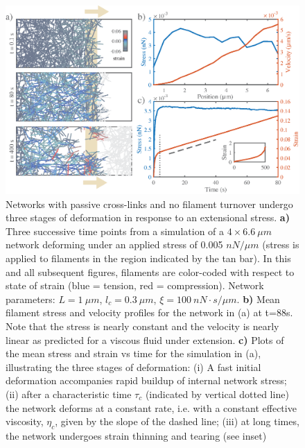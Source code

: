 \documentclass[10pt,letterpaper]{article}
\begin{document}
\begin{figure}[h!]
\centering
\includegraphics[width=\hsize]{figures/figure2}
\caption{\label{fig:passive_ex}  Networks with passive cross-links and no filament turnover undergo three stages of deformation in response to an extensional stress.   \textbf{a)} Three successive time points from a simulation of a $4\times6.6\: \mu m$ network deforming under an applied stress of 0.005 $nN/\mu m$ (stress is applied to filaments in the region indicated by the tan bar). In this and all subsequent figures, filaments are color-coded with respect to state of strain (blue = tension, red = compression).  Network parameters: $L=1\: \mu m$, $l_c=0.3\: \mu m$, $\xi=100\: nN\cdot s/\mu m$. \textbf{b)} Mean filament stress and velocity profiles for the  network in (a) at t=88s. Note that the stress is nearly constant and the velocity is nearly linear as predicted for a viscous fluid under extension.  \textbf{c)} Plots of the mean stress and strain vs time for the simulation in (a), illustrating the three stages of deformation: (i) A fast initial deformation accompanies rapid buildup of internal network stress; (ii) after a characteristic time $\tau_c$ (indicated by vertical dotted line) the network deforms at a constant rate, i.e. with a constant effective viscosity, $\eta_c$, given by the slope of the dashed line; (iii) at long times, the network undergoes strain thinning and tearing (see inset)}
\end{figure}

\end{document}
